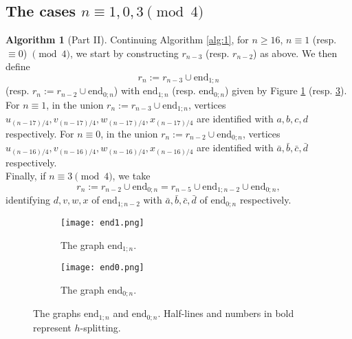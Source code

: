 \documentclass[11pt]{article}
\theoremstyle{definition}
\newtheorem{alg}[thm]{Algorithm}
\numberwithin{equation}{section}
\begin{document}
\subsection{The cases $n\equiv 1,0,3 \pmod 4$}
\label{sec:rem}
\addtocounter{thm}{-1}
\begin{alg}[Part II]
Continuing Algorithm \ref{alg:1}, for $n\geq 16$, $n\equiv 1$ (resp. $\equiv 0$) $\pmod 4$, we start by constructing $r_{n-3}$ (resp. $r_{n-2}$) as above. We then define
\begin{equation*}
r_n:=r_{n-3}\cup\text{end}_{1;n}
\end{equation*}
(resp. $r_n:=r_{n-2}\cup\text{end}_{0;n}$) with $\text{end}_{1;n}$ (resp. $\text{end}_{0;n}$) given by Figure \ref{fig:end1} (resp. \ref{fig:end0}).
\\
For $n\equiv 1$, in the union $r_n:=r_{n-3}\cup\text{end}_{1;n}$, vertices $u_{(n-17)/4},v_{(n-17)/4},w_{(n-17)/4},x_{(n-17)/4}$ are identified with $a,b,c,d$ respectively. For $n\equiv 0$, in the union $r_n:=r_{n-2}\cup\text{end}_{0;n}$, vertices $u_{(n-16)/4},v_{(n-16)/4},w_{(n-16)/4},x_{(n-16)/4}$ are identified with $\bar{a},\bar{b},\bar{c},\bar{d}$ respectively.
\\Finally, if $n\equiv 3 \pmod 4$, we take
\[r_n:=r_{n-2}\cup\text{end}_{0;n}=r_{n-5}\cup\text{end}_{1;{n-2}}\cup\text{end}_{0;n},\]
identifying $d,v,w,x$ of $\text{end}_{1;{n-2}}$ with $\bar{a},\bar{b},\bar{c},\bar{d}$ of $\text{end}_{0;n}$ respectively.

\begin{figure}[h!]
\begin{subfigure}{0.49\textwidth}
	\centering
	\texttt{[image: end1.png]}
	\caption{The graph $\text{end}_{1;n}$.}%
	\label{fig:end1}
\end{subfigure}
\begin{subfigure}{0.49\textwidth}
	\centering
	\texttt{[image: end0.png]}
	\caption{The graph $\text{end}_{0;n}$.}%
	\label{fig:end0}
\end{subfigure}
\caption{The graphs $\text{end}_{1;n}$ and $\text{end}_{0;n}$. Half-lines and numbers in bold represent $h$-splitting.}
\end{figure}
\end{alg}
\end{document}
